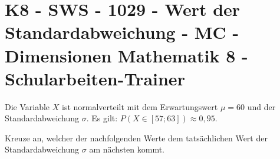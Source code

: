 \section{K8 - SWS - 1029 - Wert der Standardabweichung - MC - Dimensionen Mathematik 8 - Schularbeiten-Trainer}

\begin{beispiel}[K8 - SWS]{1}
Die Variable $X$ ist normalverteilt mit dem Erwartungswert $\mu=60$ und der Standardabweichung $\sigma$. Es gilt: $P(X\in[57; 63])\approx 0,95$.

Kreuze an, welcher der nachfolgenden Werte dem tatsächlichen Wert der Standardabweichung $\sigma$ am nächsten kommt.

\end{beispiel}